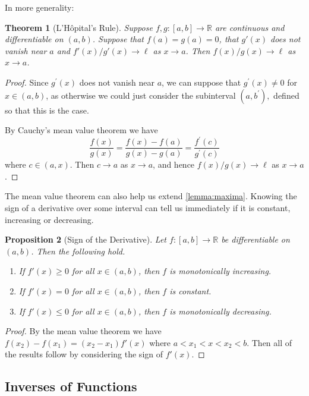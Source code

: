 \documentclass[11pt, a4paper]{article}
\newtheorem{theorem}{Theorem}[section]
\newtheorem{proposition}[theorem]{Proposition}
\theoremstyle{definition}
\newcommand{\R}{\mathbb{R}}
\begin{document}
In more generality:

\begin{theorem}[L'Hôpital's Rule]
	Suppose $f, g :[a, b] \rightarrow \R$ are continuous and differentiable on $(a, b)$. Suppose that $f(a) = g(a) = 0$, that $g'(x)$ does not vanish near $a$ and $f'(x)/g'(x) \rightarrow \ell$ as $x \rightarrow a$. Then $f(x)/g(x) \rightarrow \ell$ as $x \rightarrow a$.
\end{theorem}
\begin{proof}
Since $g^{\prime}(x)$ does not vanish near $a$, we can suppose that $g^{\prime}(x) \neq 0$ for $x \in(a, b)$, as otherwise we could just consider the subinterval $\left(a, b^{\prime}\right),$ defined so that this is the case.

By Cauchy's mean value theorem we have
$$
\frac{f(x)}{g(x)}=\frac{f(x)-f(a)}{g(x)-g(a)}=\frac{f^{\prime}(c)}{g^{\prime}(c)}
$$
where $c \in(a, x)$. Then $c \rightarrow a$ as $x \rightarrow a$, and hence $f(x) / g(x) \rightarrow \ell$ as $x \rightarrow a$.
\end{proof}

The mean value theorem can also help us extend \autoref{lemma:maxima}. Knowing the sign of a derivative over some interval can tell us immediately if it is constant, increasing or decreasing.

\begin{proposition}[Sign of the Derivative]\label{prop:sign}
	Let $f: [a, b] \rightarrow \R$ be differentiable on $(a, b)$. Then the following hold.
	\begin{enumerate}[label=(\roman*)]
		\item If $f'(x) \geq 0$ for all $x \in (a, b)$, then $f$ is monotonically increasing.
		\item If $f'(x) = 0$ for all $x \in (a, b)$, then $f$ is constant.
		\item If $f'(x) \leq 0$ for all $x \in (a, b)$, then $f$ is monotonically decreasing.
	\end{enumerate}
\end{proposition}
\begin{proof}
	By the mean value theorem we have $f(x_2) - f(x_1) = (x_2 - x_1)f'(x)$ where $a < x_1 < x < x_2 < b$. Then all of the results follow by considering the sign of $f'(x)$.
\end{proof}

\subsection{Inverses of Functions}
\end{document}
